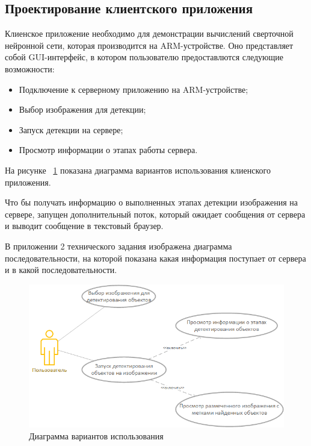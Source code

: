 \documentclass[a4paper,english,russian]{G2-105}
\begin{document}
\subsection{Проектирование клиентского приложения}
\par Клиенское приложение необходимо для демонстрации вычислений сверточной нейронной сети, которая производится на ARM-устройстве. Оно представляет собой GUI-интерфейс, в котором пользователю предоставлются следующие возможности:
\begin{itemize}
\item Подключение к серверному приложению на ARM-устройстве;
\item Выбор изображения для детекции;
\item Запуск детекции на сервере;
\item Просмотр информации о этапах работы сервера.
\end{itemize}
\par На рисунке ~\ref{usecase} показана диаграмма вариантов использования клиенского приложения.
\par Что бы получать информацию о выполненных этапах детекции изображения на сервере, запущен дополнительный поток, который ожидает сообщения от сервера и выводит сообщение в текстовый браузер. 
\par В приложении 2 технического задания изображена диаграмма последовательности, на которой показана какая информация поступает от сервера и в какой последовательности. 
\begin{figure}
    \includegraphics[width=0.6\linewidth]{usecaseclient.png}
    \caption{Диаграмма вариантов использования}
	\label{usecase}
\end{figure}
\ttl
\end{document}

